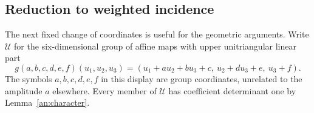 \documentclass[11pt]{amsart}
\makeatletter
\theoremstyle{definition}
\theoremstyle{remark}
\numberwithin{equation}{section}
\newcommand{\equationalias}[1]{\begingroup\protected@edef\@currentlabel{\p@equation\theequation}\protected@edef\@currentHref{equation.\theHequation}\label{#1}\endgroup}
\makeatother
\begin{document}
\subsection{Reduction to weighted incidence}\label{an:common-reduction}\label{an:incidence-reduction}

The next fixed change of coordinates is useful for the geometric arguments. Write $\mathcal U$ for the six-dimensional group of affine maps with upper unitriangular linear part
\begin{equation}\label{geo:group}
g(a,b,c,d,e,f)(u_1,u_2,u_3)=(u_1+au_2+bu_3+c,\ u_2+du_3+e,\ u_3+f).
\end{equation}
\equationalias{an:upper-affine-group}
The symbols $a,b,c,d,e,f$ in this display are group coordinates, unrelated to the amplitude $a$ elsewhere. Every member of $\mathcal U$ has coefficient determinant one by Lemma~\ref{an:character}.
\end{document}
